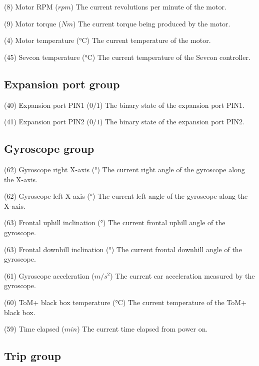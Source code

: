 {(8) Motor RPM (\(rpm\))}
{The current revolutions per minute of the motor.}

{(9) Motor torque (\(Nm\))}
{The current torque being produced by the motor.}

{(4) Motor temperature (°C)}
{The current temperature of the motor.}

{(45) Sevcon temperature (°C)}
{The current temperature of the Sevcon controller.}

\subsection{Expansion port group}

{(40) Expansion port PIN1 (\(0/1\))}
{The binary state of the expansion port PIN1.}

{(41) Expansion port PIN2 (\(0/1\))}
{The binary state of the expansion port PIN2.}

\subsection{Gyroscope group}

{(62) Gyroscope right X-axis (°)}
{The current right angle of the gyroscope along the X-axis.}

{(62) Gyroscope left X-axis (°)}
{The current left angle of the gyroscope along the X-axis.}

{(63) Frontal uphill inclination (°)}
{The current frontal uphill angle of the gyroscope.}

{(63) Frontal downhill inclination (°)}
{The current frontal downhill angle of the gyroscope.}

{(61) Gyroscope acceleration (\(m/s^2\))}
{The current car acceleration measured by the gyroscope.}

{(60) ToM+ black box temperature (°C)}
{The current temperature of the ToM+ black box.}

{(59) Time elapsed (\(min\))}
{The current time elapsed from power on.}

\subsection{Trip group}

